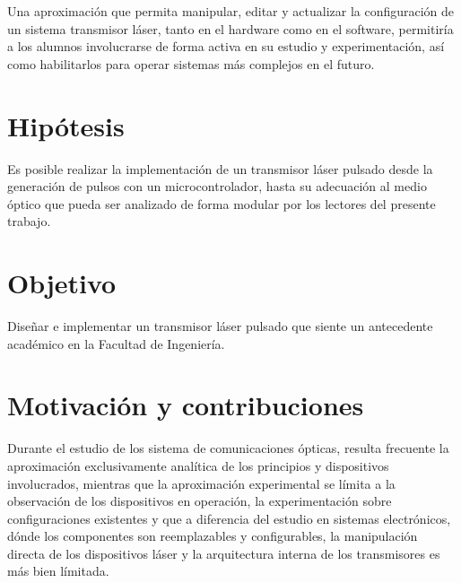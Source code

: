 Una aproximación que permita manipular, editar y  actualizar la configuración de un sistema transmisor láser, tanto en el hardware como en el software, permitiría a los alumnos involucrarse de forma activa en su estudio y experimentación, así como habilitarlos para operar sistemas más complejos en el futuro.

\section{Hipótesis}

Es posible realizar la implementación de un transmisor láser pulsado desde la generación de pulsos con un microcontrolador, hasta su adecuación al medio óptico que pueda ser analizado de forma modular por los lectores del presente trabajo.

\section{Objetivo}

Diseñar e implementar un transmisor láser pulsado que siente un antecedente académico en la Facultad de Ingeniería.

\section{Motivación y contribuciones}

Durante el estudio de los sistema de comunicaciones ópticas, resulta frecuente la aproximación exclusivamente analítica de los principios y dispositivos involucrados, mientras que la aproximación experimental se límita a la observación de los dispositivos en operación, la experimentación sobre configuraciones existentes y que a diferencia del estudio en sistemas electrónicos, dónde los componentes son reemplazables y configurables, la manipulación directa de los dispositivos láser y la arquitectura interna de los transmisores es más bien límitada. 

